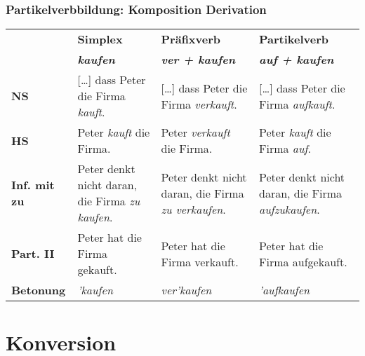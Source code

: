 \begin{frame}
\frametitle{Partikelverbbildung: Komposition \vs Derivation}

\begin{table}
\centering

\begin{tabular}{p{1.6cm}|p{3cm}|p{3cm}|p{3cm}}
 & \textbf{Simplex} & \textbf{Präfixverb} & \textbf{Partikelverb}\\
& \textit{\textbf{kaufen}} & \textit{\textbf{ver + kaufen}} & \textit{\textbf{auf + kaufen}}\\
\hline
\textbf{NS} & [\dots] dass Peter die Firma \textit{kauft}. & [\dots] dass Peter die Firma \textit{verkauft}. & [\dots] dass Peter die Firma \textit{aufkauft}.\\
\hline
\textbf{HS} & Peter \textit{kauft} die Firma. & Peter \textit{verkauft} die Firma. & Peter \textit{kauft} die Firma \textit{auf}. \\
\hline
\textbf{Inf. mit zu} & Peter denkt nicht daran, die Firma \textit{zu kaufen}. & Peter denkt nicht daran, die Firma \textit{zu verkaufen}. & Peter denkt nicht daran, die Firma \textit{aufzukaufen}.\\
\hline
\textbf{Part. II} & Peter hat die Firma gekauft. & Peter hat die Firma verkauft. & Peter hat die Firma aufgekauft. \\
\hline
\textbf{Betonung} & \textit{'kaufen} & \textit{ver'kaufen} & \textit{'aufkaufen}\\
\end{tabular}

\end{table}


\end{frame}


\section{Konversion}
%


